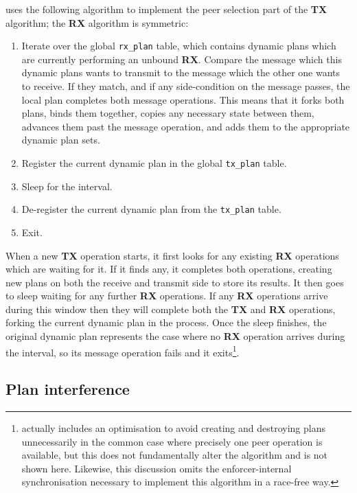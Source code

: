 {\Implementation} uses the following algorithm to implement the peer
selection part of the \textbf{TX} algorithm; the \textbf{RX} algorithm
is symmetric:
\begin{enumerate}
\item Iterate over the global \texttt{rx\_plan} table, which contains
  dynamic plans which are currently performing an unbound \textbf{RX}.
  Compare the message which this dynamic plans wants to transmit to
  the message which the other one wants to receive.  If they match,
  and if any side-condition on the message passes, the local plan
  completes both message operations.  This means that it forks both
  plans, binds them together, copies any necessary state between them,
  advances them past the message operation, and adds them to the
  appropriate dynamic plan sets.
\item Register the current dynamic plan in the global
  \texttt{tx\_plan} table.
\item Sleep for the interval.
\item De-register the current dynamic plan from the \texttt{tx\_plan}
  table.
\item Exit.
\end{enumerate}
When a new \textbf{TX} operation starts, it first looks for any
existing \textbf{RX} operations which are waiting for it.  If it finds
any, it completes both operations, creating new plans on both the
receive and transmit side to store its results.  It then goes to sleep
waiting for any further \textbf{RX} operations.  If any \textbf{RX}
operations arrive during this window then they will complete both the
\textbf{TX} and \textbf{RX} operations, forking the current dynamic
plan in the process.  Once the sleep finishes, the original dynamic
plan represents the case where no \textbf{RX} operation arrives during
the interval, so its message operation fails and it
exits\footnote{{\Implementation} actually includes an optimisation to
  avoid creating and destroying plans unnecessarily in the common case
  where precisely one peer operation is available, but this does not
  fundamentally alter the algorithm and is not shown here.  Likewise,
  this discussion omits the enforcer-internal synchronisation
  necessary to implement this algorithm in a race-free way.}\!\!\!\!.

\subsection{Plan interference}
\label{sect:enforce:plan_interference}

